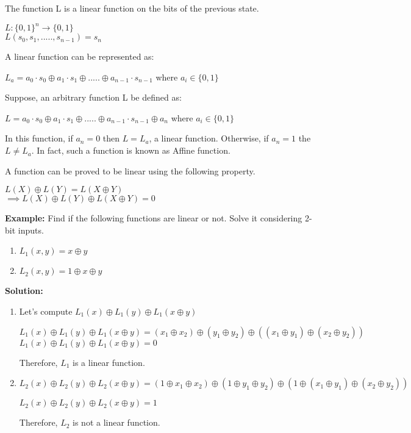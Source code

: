 \documentclass[11pt]{article}
\begin{document}
The function L is a linear function on the bits of the previous state.
\begin{center}
    $L: \{0,1\}^n \rightarrow \{0,1\}$\\
    $L(s_0, s_1,....., s_{n-1}) = s_n$
\end{center}
A linear function can be represented as:
\begin{center}
    $L_a = a_0\cdot s_0 \oplus a_1 \cdot s_1 \oplus ..... \oplus a_{n-1} \cdot s_{n-1}$ where $a_i \in \{0, 1\}$
\end{center}

Suppose, an arbitrary function L be defined as:
\begin{center}
    $L = a_0\cdot s_0 \oplus a_1 \cdot s_1 \oplus ..... \oplus a_{n-1} \cdot s_{n-1} \oplus a_n$ where $a_i \in \{0, 1\}$
\end{center}
In this function, if $a_n = 0$ then $L = L_a$, a linear function. Otherwise, if $a_n = 1$ the $L \neq L_a$. In fact, such a function is known as Affine function.

A function can be proved to be linear using the following property.
\begin{center}
    $L(X) \oplus L(Y) = L(X \oplus Y)$\\
    $\implies L(X) \oplus L(Y) \oplus L(X \oplus Y) = 0$
\end{center}
\textbf{Example:} Find if the following functions are linear or not. Solve it considering 2-bit inputs.
\begin{enumerate}
    \item $L_1(x, y) = x \oplus y$
    \item $L_2(x, y) = 1 \oplus x \oplus y$

\end{enumerate}
\textbf{Solution:} 
\begin{enumerate}
    \item Let's compute $L_1(x) \oplus L_1(y) \oplus L_1(x \oplus y)$
    \begin{center}
        $L_1(x) \oplus L_1(y) \oplus L_1(x \oplus y) = (x_1 \oplus x_2) \oplus (y_1 \oplus y_2) \oplus ((x_1 \oplus y_1) \oplus (x_2 \oplus y_2))$\\
        \vspace{1mm}
        $L_1(x) \oplus L_1(y) \oplus L_1(x \oplus y) = 0$
    \end{center}
    Therefore, $L_1$ is a linear function.
    \item $L_2(x) \oplus L_2(y) \oplus L_2(x \oplus y) = (1 \oplus x_1 \oplus x_2) \oplus (1 \oplus y_1 \oplus y_2) \oplus (1 \oplus (x_1 \oplus y_1) \oplus (x_2 \oplus y_2))$
    \begin{center}
        $L_2(x) \oplus L_2(y) \oplus L_2(x \oplus y) = 1 $
    \end{center}
    Therefore, $L_2$ is not a linear function.
\end{enumerate}
\end{document}
